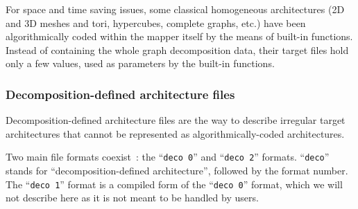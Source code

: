 For space and time saving issues, some classical homogeneous architectures
(2D and 3D meshes and tori, hypercubes, complete graphs, etc\@.) have been
algorithmically coded within the mapper itself by the means of built-in
functions.
Instead of containing the whole graph decomposition data, their target
files hold only a few values, used as parameters by the built-in functions.

\subsubsection{Decomposition-defined architecture files}
\label{sec-file-target-deco}

Decomposition-defined architecture files are the way to describe
irregular target architectures that cannot be represented as
algorithmically-coded architectures.

Two main file formats coexist~: the ``\texttt{deco 0}'' and
``\texttt{deco 2}'' formats. ``\texttt{deco}'' stands for
``decomposition-defined architecture'', followed by the format
number. The ``\texttt{deco 1}'' format is a compiled form of the
``\texttt{deco 0}'' format, which we will not describe here as it is
not meant to be handled by users.

